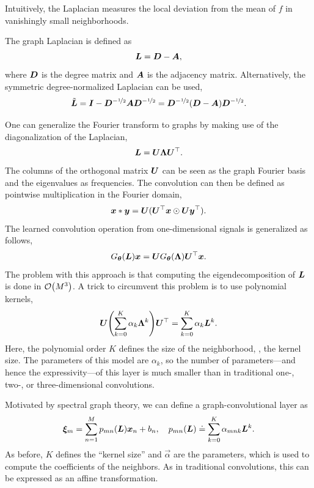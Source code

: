 Intuitively, the Laplacian measures the local deviation from the mean of $f$ in vanishingly small
neighborhoods.

\begin{definition}
    The graph Laplacian is defined as \[
        \bm{L} = \bm{D} - \bm{A},
    \]
    where $\bm{D}$ is the degree matrix and $\bm{A}$ is the adjacency matrix. Alternatively, the
    symmetric degree-normalized Laplacian can be used, \[
        \tilde{\bm{L}} = \bm{I} - \bm{D}^{-\nicefrac{1}{2}} \bm{A} \bm{D}^{-\nicefrac{1}{2}} = \bm{D}^{-\nicefrac{1}{2}} (\bm{D} - \bm{A}) \bm{D}^{-\nicefrac{1}{2}}.
    \]
\end{definition}

One can generalize the Fourier transform to graphs by making use of the diagonalization of the
Laplacian, \[
    \bm{L} = \bm{U} \bm{\Lambda} \bm{U}^\top.
\]
The columns of the orthogonal matrix $\bm{U}$ can be seen as the graph Fourier basis and the
eigenvalues as frequencies. The convolution can then be defined as pointwise multiplication in the
Fourier domain, \[
    \bm{x} * \bm{y} = \bm{U} (\bm{U}^\top \bm{x} \odot \bm{U} \bm{y}^\top).
\]
The learned convolution operation from one-dimensional signals is generalized as follows, \[
    G_{\bm{\theta}}(\bm{L})\bm{x} = \bm{U}G_{\bm{\theta}}(\bm{\Lambda}) \bm{U}^\top\bm{x}.
\]
The problem with this approach is that computing the eigendecomposition of $\bm{L}$ is done in
$\bigo{M^3}$. A trick to circumvent this problem is to use polynomial kernels, \[
    \mat{U} \lft( \sum_{k=0}^{K} \alpha_k \mat{\Lambda}^k \rgt) \transpose{\mat{U}} = \sum_{k=0}^{K} \alpha_k \mat{L}^k.
\]
Here, the polynomial order $K$ defines the size of the neighborhood, \ie, the kernel size. The
parameters of this model are $\alpha_k$, so the number of parameters---and hence the
expressivity---of this layer is much smaller than in traditional one-, two-, or three-dimensional
convolutions.

Motivated by spectral graph theory, we can define a graph-convolutional layer as \[
    \bm{\xi}_m = \sum_{n=1}^{M} p_{mn}(\bm{L}) \bm{x}_n + b_n, \quad p_{mn}(\bm{L}) \doteq \sum_{k=0}^{K} \alpha_{mnk} \bm{L}^k.
\]
As before, $K$ defines the ``kernel size'' and $\vec{\alpha}$ are the parameters, which is used to
compute the coefficients of the neighbors. As in traditional convolutions, this can be expressed as
an affine transformation.
